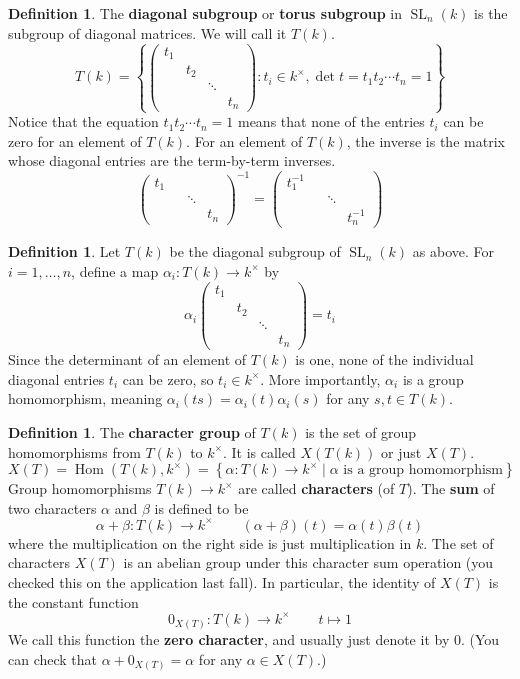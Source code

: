 \documentclass[12pt]{article}
\theoremstyle{definition}
\newtheorem{definition}[theorem]{Definition}
\newcommand{\lb}{\left\{}
\newcommand{\rb}{\right\}}
\newcommand{\tbf}{\textbf}
\newcommand{\inv}{^{-1}}
\DeclareMathOperator{\Hom}{Hom}
\DeclareMathOperator{\SL}{SL}
\begin{document}
\begin{definition}
The \tbf{diagonal subgroup} or \tbf{torus subgroup} in $\SL_n(k)$ is the subgroup of diagonal matrices. We will call it $T(k)$.
\[
	T(k) =
	\lb
	\begin{pmatrix}
		t_1 \\
		& t_2 \\
		&& \ddots \\
		&&& t_n
	\end{pmatrix}
	: t_i \in k^\times, \det t = t_1 t_2 \cdots t_n = 1
	\rb
\]
Notice that the equation $t_1 t_2 \cdots t_n = 1$ means that none of the entries $t_i$ can be zero for an element of $T(k)$. For an element of $T(k)$, the inverse is the matrix whose diagonal entries are the term-by-term inverses.
\[
	\begin{pmatrix}
		t_1 \\
		&& \ddots \\
		&&& t_n
	\end{pmatrix}
	\inv
	=
	\begin{pmatrix}
		t_1 \inv \\
		&& \ddots \\
		&&& t_n \inv
	\end{pmatrix}
\]
\end{definition}

\begin{definition}
Let $T(k)$ be the diagonal subgroup of $\SL_n(k)$ as above. For $i=1, \ldots, n$, define a map $\alpha_i:T(k) \to k^\times$ by
\[
	\alpha_i
	\begin{pmatrix}
		t_1 \\
		& t_2 \\
		&& \ddots \\
		&&& t_n
	\end{pmatrix}
	= t_i
\]
Since the determinant of an element of $T(k)$ is one, none of the individual diagonal entries $t_i$ can be zero, so $t_i \in k^\times$. More importantly, $\alpha_i$ is a group homomorphism, meaning $\alpha_i(ts) = \alpha_i(t) \alpha_i(s)$ for any $s,t \in T(k)$.
\end{definition}

\begin{definition}
The \tbf{character group} of $T(k)$ is the set of group homomorphisms from $T(k)$ to $k^\times$. It is called $X(T(k))$ or just $X(T)$.
\[
	X(T) = \Hom(T(k), k^\times) = \lb \alpha:T(k) \to k^\times \mid \alpha \text{ is a group homomorphism} \rb
\]
Group homomorphisms $T(k) \to k^\times$ are called \tbf{characters} (of $T$). The \tbf{sum} of two characters $\alpha$ and $\beta$ is defined to be
\[
	\alpha+\beta:T(k) \to k^\times \qquad (\alpha+\beta)(t) = \alpha(t)  \beta(t)
\]
where the multiplication on the right side is just multiplication in $k$. The set of characters $X(T)$ is an abelian group under this character sum operation (you checked this on the application last fall). In particular, the identity of $X(T)$ is the constant function
\[
	0_{X(T)}:T(k) \to k^\times \qquad t \mapsto 1
\]
We call this function the \tbf{zero character}, and usually just denote it by $0$. (You can check that $\alpha + 0_{X(T)} = \alpha$ for any $\alpha \in X(T)$.)
\end{definition}
\end{document}
